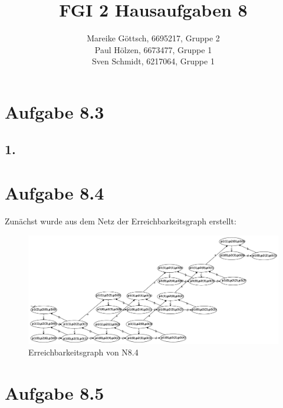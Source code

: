 \documentclass[12pt, paper=a4]{article}
\author{Mareike G\"ottsch, 6695217, Gruppe 2\\Paul H\"olzen, 6673477, Gruppe 1\\Sven Schmidt, 6217064, Gruppe 1}
\title{FGI 2 Hausaufgaben 8}
\begin{document}
\maketitle

\section*{Aufgabe 8.3}
\subsection*{1.}



\section*{Aufgabe 8.4}

Zun\"achst wurde aus dem Netz der Erreichbarkeitsgraph erstellt:

\begin{figure}[h!]
\centering
\includegraphics[scale=0.25]{8_4errg.pdf}
\caption{Erreichbarkeitsgraph von N8.4}
\end{figure}

\section*{Aufgabe 8.5}
\end{document}
